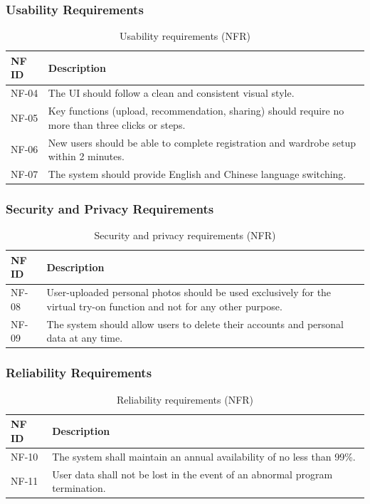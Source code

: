 \subsubsection{Usability Requirements}

\begin{table}[H]
\centering
\small
\caption{Usability requirements (NFR)}
\label{tab:nfr_usability}
\begin{tabular}{p{1.6cm}p{13.2cm}}
\toprule
\textbf{NF ID} & \textbf{Description} \\
\midrule
NF-04 & The UI should follow a clean and consistent visual style. \\
NF-05 & Key functions (upload, recommendation, sharing) should require no more than three clicks or steps. \\
NF-06 & New users should be able to complete registration and wardrobe setup within 2 minutes. \\
NF-07 & The system should provide English and Chinese language switching. \\
\bottomrule
\end{tabular}
\end{table}


\subsubsection{Security and Privacy Requirements}

\begin{table}[H]
\centering
\small
\caption{Security and privacy requirements (NFR)}
\label{tab:nfr_security}
\begin{tabular}{p{1.6cm}p{13.2cm}}
\toprule
\textbf{NF ID} & \textbf{Description} \\
\midrule
NF-08 & User-uploaded personal photos should be used exclusively for the virtual try-on function and not for any other purpose. \\
NF-09 & The system should allow users to delete their accounts and personal data at any time. \\
\bottomrule
\end{tabular}
\end{table}


\subsubsection{Reliability Requirements}

\begin{table}[H]
\centering
\small
\caption{Reliability requirements (NFR)}
\label{tab:nfr_reliability}
\begin{tabular}{p{1.6cm}p{13.2cm}}
\toprule
\textbf{NF ID} & \textbf{Description} \\
\midrule
NF-10 & The system shall maintain an annual availability of no less than 99\%. \\
NF-11 & User data shall not be lost in the event of an abnormal program termination. \\
\bottomrule
\end{tabular}
\end{table}


